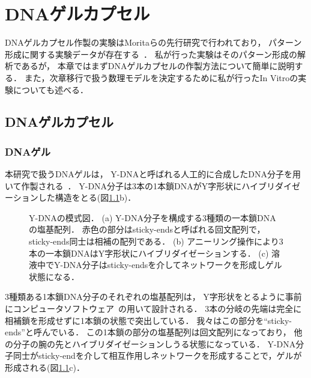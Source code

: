 \chapter{DNAゲルカプセル}
\label{sec:dnagel}

DNAゲルカプセル作製の実験はMoritaらの先行研究で行われており，
パターン形成に関する実験データが存在する~\cite{moritasan}．
私が行った実験はそのパターン形成の解析であるが，
本章ではまずDNAゲルカプセルの作製方法について簡単に説明する．
また，次章移行で扱う数理モデルを決定するために私が行ったIn Vitroの実験についても述べる．

\section{DNAゲルカプセル}

\subsection{DNAゲル}
本研究で扱うDNAゲルは，
Y-DNAと呼ばれる人工的に合成したDNA分子を用いて作製される~\cite{morita2017formation}．
Y-DNA分子は3本の1本鎖DNAがY字形状にハイブリダイゼーションした構造をとる(図\ref{fig:ydna}b)．
\begin{figure}
    \centering
    
    \caption{Y-DNAの模式図．
        (a) Y-DNA分子を構成する3種類の一本鎖DNAの塩基配列．
            赤色の部分はsticky-endsと呼ばれる回文配列で，sticky-ends同士は相補の配列である．
        (b) アニーリング操作により3本の一本鎖DNAはY字形状にハイブリダイゼーションする．
        (c) 溶液中でY-DNA分子はsticky-endsを介してネットワークを形成しゲル状態になる．
    }
    \label{fig:ydna}
\end{figure}
3種類ある1本鎖DNA分子のそれぞれの塩基配列は，
Y字形状をとるように事前にコンピュータソフトウェア~\cite{zadeh2011nupack}の用いて設計される．
3本の分岐の先端は完全に相補鎖を形成せずに1本鎖の状態で突出している．
我々はこの部分を``sticky-ends''と呼んでいる．
この1本鎖の部分の塩基配列は回文配列になっており，
他の分子の腕の先とハイブリダイゼーションしうる状態になっている．
Y-DNA分子同士がsticky-endを介して相互作用しネットワークを形成することで，ゲルが形成される(図\ref{fig:ydna}c)．

